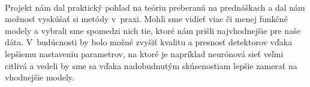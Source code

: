 \documentclass[11pt, a4paper]{article}
\begin{document}
	\\
	
	Projekt nám dal praktický pohľad na teóriu preberanú na prednáškach a dal nám možnosť vyskúšať si metódy v~praxi. Mohli sme vidieť viac či menej funkčné modely a vybrali sme spomedzi nich tie, ktoré nám prišli najvhodnejšie pre naše dáta. V~budúcnosti by bolo možné zvyšiť kvalitu a presnosť detektorov vďaka lepšiemu nastaveniu parametrov, na ktoré je napríklad neurónová sieť veľmi citlivá a vedeli by sme sa vďaka nadobudnutým skúsenostiam lepšie zamerať na vhodnejšie modely.
\end{document}
